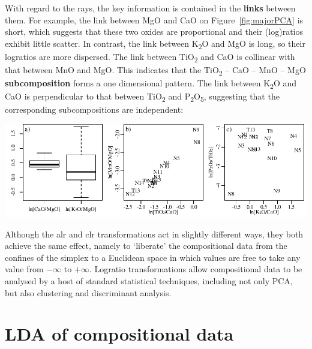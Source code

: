 With regard to the rays, the key information is contained in the
\textbf{links} between them. For example, the link between MgO and CaO
on Figure~\ref{fig:majorPCA} is short, which suggests that these two
oxides are proportional and their (log)ratios exhibit little
scatter. In contrast, the link between K\textsubscript{2}O and MgO is
long, so their logratios are more dispersed. The link between
TiO\textsubscript{2} and CaO is collinear with that between MnO and
MgO. This indicates that the TiO\textsubscript{2} -- CaO -- MnO -- MgO
\textbf{subcomposition} forms a one dimensional pattern. The link
between K\textsubscript{2}O and CaO is perpendicular to that between
TiO\textsubscript{2} and P\textsubscript{2}O\textsubscript{5},
suggesting that the corresponding subcompositions are independent:
\begin{center}
\noindent\includegraphics[width=.95\textwidth]{../figures/links.pdf}
  \label{fig:links}
\end{center}

Although the alr and clr transformations act in slightly different
ways, they both achieve the same effect, namely to `liberate' the
compositional data from the confines of the simplex to a Euclidean
space in which values are free to take any value from $-\infty$ to
$+\infty$. Logratio transformations allow compositional data to be
analysed by a host of standard statistical techniques, including not
only PCA, but also clustering and discriminant analysis.

\section{LDA of compositional data}
\label{sec:compositionalLDA}

